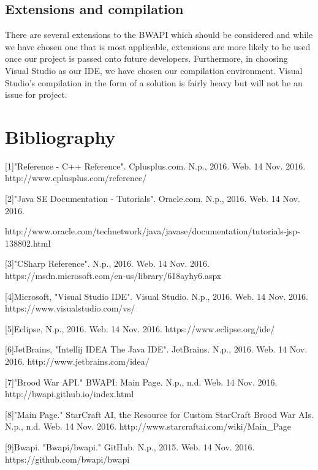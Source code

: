 \documentclass[10pt,letterpaper,onecolumn,draftclsnofoot]{IEEEtran}
\begin{document}
\subsection{Extensions and compilation}
There are several extensions to the BWAPI which should be considered and while we have chosen one that is most applicable, extensions are more likely to be used once our project is passed onto future developers. Furthermore, in choosing Visual Studio as our IDE, we have chosen our compilation environment. Visual Studio's compilation in the form of a solution is fairly heavy but will not be an issue for project.


\newpage

\section{Bibliography}
[1]"Reference - C++ Reference". Cplusplus.com. N.p., 2016. Web. 14 Nov. 2016. http://www.cplusplus.com/reference/

[2]"Java SE Documentation - Tutorials". Oracle.com. N.p., 2016. Web. 14 Nov. 2016.

http://www.oracle.com/technetwork/java/javase/documentation/tutorials-jsp-138802.html

[3]"CSharp Reference". N.p., 2016. Web. 14 Nov. 2016. https://msdn.microsoft.com/en-us/library/618ayhy6.aspx

[4]Microsoft, "Visual Studio IDE". Visual Studio. N.p., 2016. Web. 14 Nov. 2016. https://www.visualstudio.com/vs/

[5]Eclipse, N.p., 2016. Web. 14 Nov. 2016. https://www.eclipse.org/ide/

[6]JetBrains, "Intellij IDEA The Java IDE". JetBrains. N.p., 2016. Web. 14 Nov. 2016. http://www.jetbrains.com/idea/

[7]"Brood War API." BWAPI: Main Page. N.p., n.d. Web. 14 Nov. 2016. http://bwapi.github.io/index.html

[8]"Main Page." StarCraft AI, the Resource for Custom StarCraft Brood War AIs. N.p., n.d. Web. 14 Nov. 2016. http://www.starcraftai.com/wiki/Main\_Page

[9]Bwapi. "Bwapi/bwapi." GitHub. N.p., 2015. Web. 14 Nov. 2016.  https://github.com/bwapi/bwapi
\end{document}
